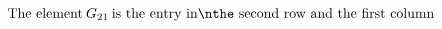 \documentclass[preview]{standalone}
\begin{document}
\begin{align*}
\text{The element}\:G_{ 2 1 }\:\text{is the entry in\nthe second row and the first column}
\end{align*}
\end{document}
